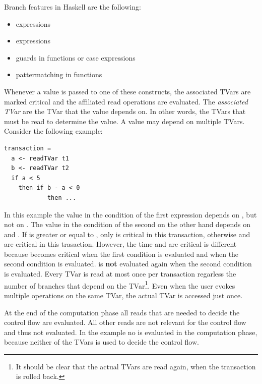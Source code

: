 Branch features in Haskell are the following:
\begin{itemize}
 \item {} expressions
 \item {} expressions
 \item guards in functions or case expressions
 \item pattermatching in functions
\end{itemize}
Whenever a value is passed to one of these constructs, the associated TVars are marked critical
and the affiliated read operations are evaluated. The \textit{associated TVar} are the TVar 
that the value depends on. In other words, the TVars that must be read to determine the value.
A value may depend on multiple TVars. Consider the following example:
\begin{lstlisting}
transaction =
  a <- readTVar t1
  b <- readTVar t2
  if a < 5
    then if b - a < 0 
            then ...
\end{lstlisting}
In this example the value in the condition of the first  expression depends on , but not
on . The value in the condition of the second  on the other hand 
depends on  and . If  is greater or equal to , only  is critical
in this transaction, otherwise  and  are critical in this trasaction. However, the time 
 and  are critical is different because  becomes critical when the first  
condition is evaluated and  when the second  condition is evaluated.  is \textbf{not} 
evaluated again when the second  condition is evaluated. Every TVar is read at most once per 
transaction regarless the number of branches that depend on the TVar\footnote{It should be clear that the
actual TVars are read again, when the transaction is rolled back.}. Even when the user evokes
multiple  operations on the same TVar, the actual TVar is accessed just once. 

At the end of the computation phase all reads that are needed to decide the control flow are evaluated. 
All other reads are not relevant for the control flow and thus not evaluated. 
In the  example no  is evaluated in the computation phase, because neither of the 
TVars is used to decide the control flow.

